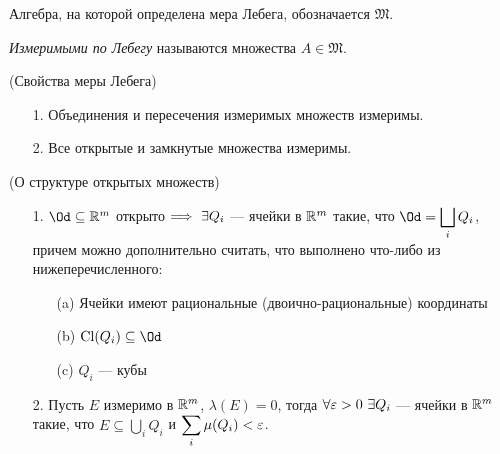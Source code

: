 \begin{definition}
    Алгебра, на которой определена мера Лебега, обозначается $\mathfrak{M}$.
\end{definition}

\begin{definition}
    \textit{Измеримыми по Лебегу} называются множества $A \in \mathfrak{M}$.
\end{definition}

\begin{theorem}(Свойства меры Лебега)
    \begin{itemize}
        \item[1.] Объединения и пересечения измеримых множеств измеримы.
        \item[2.] Все открытые и замкнутые множества измеримы.
    \end{itemize}
\end{theorem}

\begin{lemma}(О структуре открытых множеств)
    \begin{itemize}
        \item[1.] $\Od \subseteq \Rm$ открыто $\Longrightarrow~ \exists Q_i$ --- ячейки в $\mathbb{R}^m$
        такие, что $\displaystyle \Od = \bigsqcup_{i}{Q_i}$, причем можно
        дополнительно считать, что выполнено что-либо из нижеперечисленного:
        \begin{itemize}
            \item[(a)] Ячейки имеют рациональные (двоично-рациональные) координаты
            \item[(b)] $\Cl(Q_i) \subseteq \Od$
            \item[(c)] $Q_i$ --- кубы
        \end{itemize}
        \item[2.] Пусть $E$ измеримо в $\mathbb{R}^m$, $\lambda(E) = 0$, тогда
        $\forall \varepsilon > 0~\exists Q_i$ --- ячейки в $\mathbb{R}^m$ такие, что
        $\displaystyle E \subseteq \bigcup_{i}{Q_i}$ и $\displaystyle
        \sum_{i}{\mu(Q_i)} < \varepsilon$.
    \end{itemize}
\end{lemma}

